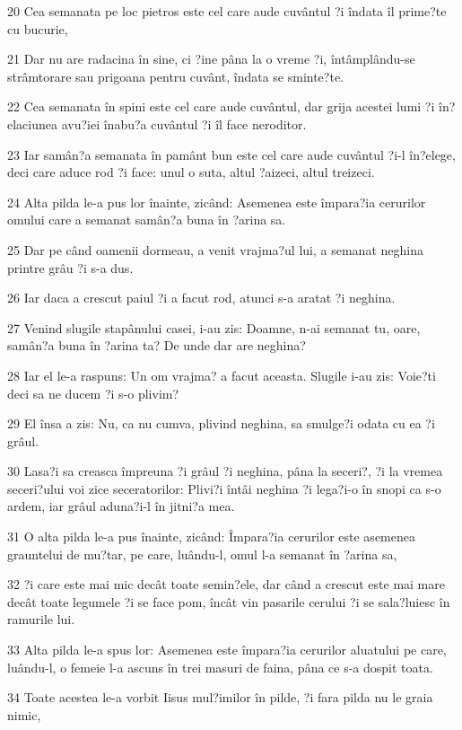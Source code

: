 \par 20 Cea semanata pe loc pietros este cel care aude cuvântul ?i îndata îl prime?te cu bucurie,
\par 21 Dar nu are radacina în sine, ci ?ine pâna la o vreme ?i, întâmplându-se strâmtorare sau prigoana pentru cuvânt, îndata se sminte?te.
\par 22 Cea semanata în spini este cel care aude cuvântul, dar grija acestei lumi ?i în?elaciunea avu?iei înabu?a cuvântul ?i îl face neroditor.
\par 23 Iar samân?a semanata în pamânt bun este cel care aude cuvântul ?i-l în?elege, deci care aduce rod ?i face: unul o suta, altul ?aizeci, altul treizeci.
\par 24 Alta pilda le-a pus lor înainte, zicând: Asemenea este împara?ia cerurilor omului care a semanat samân?a buna în ?arina sa.
\par 25 Dar pe când oamenii dormeau, a venit vrajma?ul lui, a semanat neghina printre grâu ?i s-a dus.
\par 26 Iar daca a crescut paiul ?i a facut rod, atunci s-a aratat ?i neghina.
\par 27 Venind slugile stapânului casei, i-au zis: Doamne, n-ai semanat tu, oare, samân?a buna în ?arina ta? De unde dar are neghina?
\par 28 Iar el le-a raspuns: Un om vrajma? a facut aceasta. Slugile i-au zis: Voie?ti deci sa ne ducem ?i s-o plivim?
\par 29 El însa a zis: Nu, ca nu cumva, plivind neghina, sa smulge?i odata cu ea ?i grâul.
\par 30 Lasa?i sa creasca împreuna ?i grâul ?i neghina, pâna la seceri?, ?i la vremea seceri?ului voi zice seceratorilor: Plivi?i întâi neghina ?i lega?i-o în snopi ca s-o ardem, iar grâul aduna?i-l în jitni?a mea.
\par 31 O alta pilda le-a pus înainte, zicând: Împara?ia cerurilor este asemenea grauntelui de mu?tar, pe care, luându-l, omul l-a semanat în ?arina sa,
\par 32 ?i care este mai mic decât toate semin?ele, dar când a crescut este mai mare decât toate legumele ?i se face pom, încât vin pasarile cerului ?i se sala?luiesc în ramurile lui.
\par 33 Alta pilda le-a spus lor: Asemenea este împara?ia cerurilor aluatului pe care, luându-l, o femeie l-a ascuns în trei masuri de faina, pâna ce s-a dospit toata.
\par 34 Toate acestea le-a vorbit Iisus mul?imilor în pilde, ?i fara pilda nu le graia nimic,
